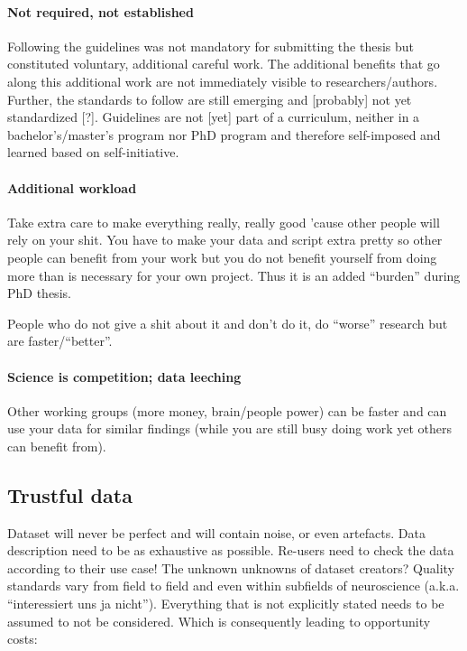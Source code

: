 \paragraph{Not required, not established}
%
Following the guidelines was not mandatory for submitting the thesis but
constituted voluntary, additional careful work.
%
The additional benefits that go along this additional work are not immediately
visible to researchers/authors.
%
Further, the standards to follow are still emerging and [probably] not yet
standardized [?].
%
Guidelines are not [yet] part of a curriculum, neither in a bachelor's/master's
program nor PhD program and therefore self-imposed and learned based on
self-initiative.


\paragraph{Additional workload}
%
Take extra care to make everything really, really good 'cause other people will
rely on your shit.
%
You have to make your data and script extra pretty so other people can benefit
from your work but you do not benefit yourself from doing more than is necessary
for your own project.
%
Thus it is an added ``burden'' during PhD thesis.

%
People who do not give a shit about it and don't do it, do ``worse'' research
but are faster/``better''.


\paragraph{Science is competition; data leeching}
%
Other working groups (more money, brain/people power) can be faster and can use
your data for similar findings (while you are still busy doing work yet others
can benefit from).


\subsection{Trustful data}


%
Dataset will never be perfect and will contain noise, or even artefacts.
%
Data description need to be as exhaustive as possible.
%
Re-users need to check the data according to their use case!
%
The unknown unknowns of dataset creators?
%
Quality standards vary from field to field and even within subfields of
neuroscience (a.k.a. ``interessiert uns ja nicht'').
%
Everything that is not explicitly stated needs to be assumed to not be
considered.
%
Which is consequently leading to opportunity costs:


